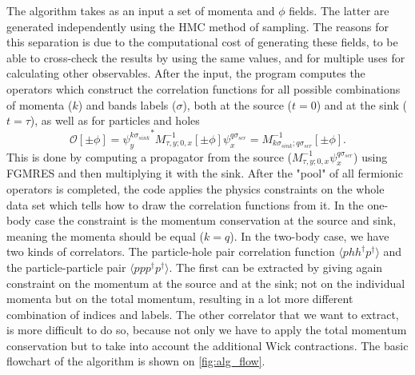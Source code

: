 The algorithm takes as an input a set of momenta and $\phi$ fields. The latter are generated independently using the HMC method of sampling. The reasons for this separation is due to the computational cost of generating these fields, to be able to cross-check the results by using the same values, and for multiple uses for calculating other observables. After the input, the program computes the operators which construct the correlation functions for all possible combinations of momenta ($k$) and bands labels ($\sigma$), both at the source ($t=0$) and at the sink ($t=\tau$), as well as for particles and holes
\begin{equation}
    \mathcal{O}[\pm\phi] = {\psi^{k\sigma_{sink}}_{y}}^{*}M^{-1}_{\tau,y;0,x}[\pm\phi]\psi^{q\sigma_{scr}}_{x} = M^{-1}_{k\sigma_{sink};q\sigma_{scr}}[\pm\phi].
\end{equation}
This is done by computing a propagator from the source ($M^{-1}_{\tau,y;0,x}\psi^{q\sigma_{scr}}_{x}$) using FGMRES and then multiplying it with the sink. After the "pool" of all fermionic operators is completed, the code applies the physics constraints on the whole data set which tells how to draw the correlation functions from it. In the one-body case the constraint is the momentum conservation at the source and sink, meaning the momenta should be equal ($k=q$). In the two-body case, we have two kinds of correlators. The particle-hole pair correlation function $\langle phh^\dagger p^\dagger\rangle$ and the particle-particle pair $\langle ppp^\dagger p^\dagger\rangle$. The first can be extracted by giving again constraint on the momentum at the source and at the sink; not on the individual momenta but on the total momentum, resulting in a lot more different combination of indices and labels. The other correlator that we want to extract, is more difficult to do so, because not only we have to apply the total momentum conservation but to take into account the additional Wick contractions. The basic flowchart of the algorithm is shown on \cref{fig:alg_flow}.
